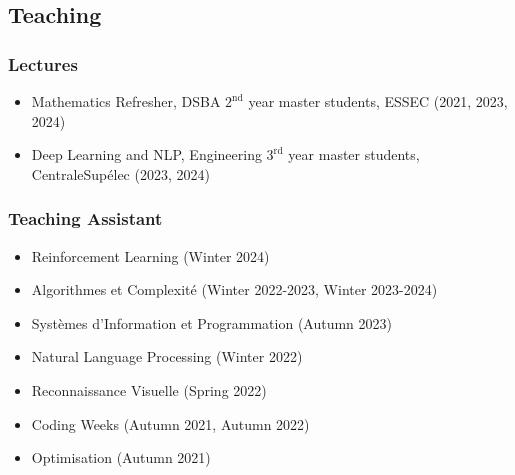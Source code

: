 \subsection*{Teaching}
\subsubsection*{Lectures}
\begin{itemize}
	\item Mathematics Refresher, DSBA $2^\text{nd}$ year master students, ESSEC (2021, 2023, 2024)
	\item Deep Learning and NLP, Engineering $3^\text{rd}$ year master students, CentraleSupélec (2023, 2024)
\end{itemize}

\subsubsection*{Teaching Assistant}
\begin{itemize}
	\item Reinforcement Learning (Winter 2024)
	\item Algorithmes et Complexité (Winter 2022-2023, Winter 2023-2024)
	\item Systèmes d'Information et Programmation (Autumn 2023)
	\item Natural Language Processing (Winter 2022)
	\item Reconnaissance Visuelle (Spring 2022)
	\item Coding Weeks (Autumn 2021, Autumn 2022)
	\item Optimisation (Autumn 2021)
\end{itemize}

